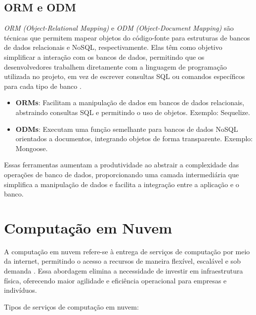 \subsection{ORM e ODM}

\emph{ORM (Object-Relational Mapping)} e \emph{ODM (Object-Document Mapping)} são técnicas que permitem mapear objetos do código-fonte para estruturas de bancos de dados relacionais e NoSQL, respectivamente. Elas têm como objetivo simplificar a interação com os bancos de dados, permitindo que os desenvolvedores trabalhem diretamente com a linguagem de programação utilizada no projeto, em vez de escrever consultas SQL ou comandos específicos para cada tipo de banco \cite{orm-vs-odm}.

\begin{itemize}
    \item \textbf{ORMs}: Facilitam a manipulação de dados em bancos de dados relacionais, abstraindo consultas SQL e permitindo o uso de objetos. Exemplo: Sequelize.
    \item \textbf{ODMs}: Executam uma função semelhante para bancos de dados NoSQL orientados a documentos, integrando objetos de forma transparente. Exemplo: Mongoose.
\end{itemize}

Essas ferramentas aumentam a produtividade ao abstrair a complexidade das operações de banco de dados, proporcionando uma camada intermediária que simplifica a manipulação de dados e facilita a integração entre a aplicação e o banco.


\section{Computação em Nuvem}


A computação em nuvem refere-se à entrega de serviços de computação por meio da internet, permitindo o acesso a recursos de maneira flexível, escalável e sob demanda \cite{what-is-cloud}. Essa abordagem elimina a necessidade de investir em infraestrutura física, oferecendo maior agilidade e eficiência operacional para empresas e indivíduos.

Tipos de serviços de computação em nuvem:

